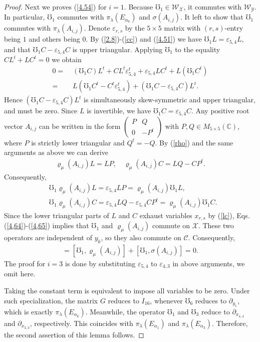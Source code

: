 \documentclass[12pt]{article}
\numberwithin{equation}{section}
\theoremstyle{definition}
\theoremstyle{remark}
\begin{document}
\begin{proof}
	Next we proves (\ref{4.54}) for $i=1$. Because $\mho_1\in\mathscr{W}_{\mathscr{X}}$, it commutes with $\mathscr{W}_{\mathscr{Y}}$. In particular, $\mho_1$  commutes with $\pi_{\lambda}(E_{\alpha_6})$ and $\sigma(A_{i,j})$. It left to show that $\mho_1$ commutes with $\pi_{\lambda}(A_{i,j})$.
	Denote $\varepsilon_{r,s}$ by the $5\times 5$ matrix with $(r,s)$-entry being $1$ and others being $0$. By (\ref{2.8})-(\ref{cc}) and (\ref{4.51}) we have $\mho_1L=\varepsilon_{5,4}L$, and that $\mho_1C-\varepsilon_{5,4}C$ is upper triangular. Applying $\mho_1$ to the equality $CL^t+LC^t=0$ we obtain
	\begin{align}
		0=&\;(\mho_1C)L^t+CL^t\varepsilon_{5,4}^{t}+\varepsilon_{5,4}LC^t+L(\mho_1C^t)\nonumber\\=&\;L(\mho_1C^t-C^t\varepsilon_{5,4}^t)+(\mho_1C-\varepsilon_{5,4}C)L^t.
	\end{align}
	Hence $(\mho_1C-\varepsilon_{5,4}C)L^t$ is simultaneously skew-symmetric and upper triangular, and must be zero. Since $L$ is invertible, we have $\mho_1C=\varepsilon_{5,4}C$. Any positive root vector $A_{i,j}$ can be written in the form $\begin{pmatrix}
		P&Q\\
		0&-P^t
	\end{pmatrix}$ with $P,Q\in M_{5\times 5}(\mathbb{C})$, where $P$ is strictly lower triangular and $Q^{t}=-Q$. By (\ref{rho}) and the same arguments as above we can derive
	\begin{eqnarray}
		\varrho_{\mu}(A_{i,j})L=LP, \quad \varrho_{\mu}(A_{i,j})C=LQ-CP^t.
	\end{eqnarray}
	Consequently,
	\begin{eqnarray}
		&\mho_1\varrho_{\mu}(A_{i,j})L=\varepsilon_{5,4}LP=\varrho_{\mu}(A_{i,j})\mho_1L, \label{4,64}\\
		&\mho_1\varrho_{\mu}(A_{i,j})C=\varepsilon_{5,4}LQ-\varepsilon_{5,4}CP^t=\varrho_{\mu}(A_{i,j})\mho_1C. \label{4,65}
	\end{eqnarray}
	Since the lower triangular parts of $L$ and $C$ exhaust variables $x_{r,s}$ by (\ref{lc}), Eqs. (\ref{4,64})-(\ref{4,65}) implies that $\mho_1$ and $\varrho_{\mu}(A_{i,j})$ commute on $\mathscr{X}$. These two operators are independent of $y_k$, so they also commute on $\mathscr{C}$. Consequently,
	\begin{eqnarray}
		[\mho_1,\pi_{\lambda}(A_{i,j})]=[\mho_1,\varrho_{\mu}(A_{i,j})]+[\mho_1,\sigma(A_{i,j})]=0.
	\end{eqnarray}
	The proof for $i=3$ is done by substituting $\varepsilon_{5,4}$ to $\varepsilon_{4,3}$ in above arguments, we omit here.
	
	
	Taking the constant term is equivalent to impose all variables to be zero. Under such specialization, the matrix $G$ reduces to $I_{16}$, whenever $\mho_6$ reduces to $\partial_{y_1}$, which is exactly $\pi_{\lambda}(E_{\alpha_6})$. Meanwhile, the operator $\mho_1$ and $\mho_3$ reduce to $\partial_{x_{4,4}}$ and $\partial_{x_{3,3}}$, respectively. This coincides with $\pi_{\lambda}(E_{\alpha_1})$ and  $\pi_{\lambda}(E_{\alpha_3})$. Therefore, the second assertion of this lemma follows.
\end{proof}
\end{document}

